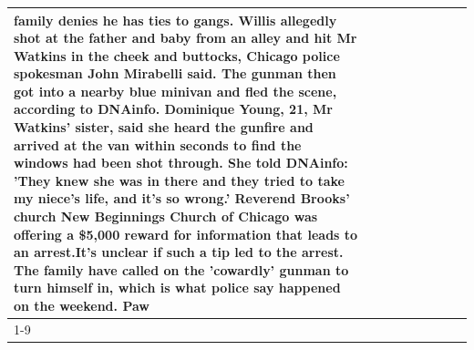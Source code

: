 \begin{table}[H]
\begin{tabular}{lllrlllll}
family denies he has ties to gangs. Willis allegedly shot at the father and baby from an alley and hit Mr Watkins in the cheek and buttocks, Chicago police spokesman John Mirabelli said. The gunman then got into a nearby blue minivan and fled the scene, according to DNAinfo. Dominique Young, 21, Mr Watkins' sister, said she heard the gunfire and arrived at the van within seconds to find the windows had been shot through. She told DNAinfo: 'They knew she was in there and they tried to take my niece's life, and it's so wrong.' Reverend Brooks' church New Beginnings Church of Chicago was offering a \$5,000 reward for information that leads to an arrest.It's unclear if such a tip led to the arrest. The family have called on the 'cowardly' gunman to turn himself in, which is what police say happened on the weekend. Paw \\
\cline{1-9}

\end{tabular}
\end{table}
